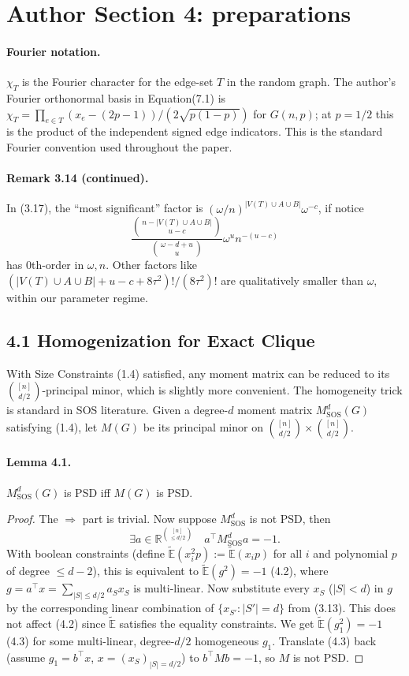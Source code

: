 \documentclass[10pt,a4paper]{article}
\begin{document}
\section*{Author Section 4: preparations}
\paragraph{Fourier notation.} $\chi_T$ is the Fourier character for the edge-set $T$ in the random graph. The author's Fourier orthonormal basis in Equation(7.1) is $\chi_T=\prod_{e\in T}(x_e-(2p-1))/(2\sqrt{p(1-p)})$ for $G(n,p)$; at $p=1/2$ this is the product of the independent signed edge indicators. This is the standard Fourier convention used throughout the paper.
\paragraph{Remark 3.14 (continued).} In (3.17), the ``most significant'' factor is $(\omega/n)^{|V(T)\cup A\cup B|}\omega^{-c}$, if notice
\[\frac{\binom{n-|V(T)\cup A\cup B|}{u-c}}{\binom{\omega-d+u}u}\omega^un^{-(u-c)}\]
has 0th-order in $\omega,n$. Other factors like $(|V(T)\cup A\cup B|+u-c+8\tau^2)!/(8\tau^2)!$ are qualitatively smaller than $\omega$, within our parameter regime.
\subsection*{4.1 Homogenization for Exact Clique}
With Size Constraints (1.4) satisfied, any moment matrix can be reduced to its $\binom{[n]}{d/2}$-principal minor, which is slightly more convenient. The homogeneity trick is standard in SOS literature. Given a degree-$d$ moment matrix $M^d_{\mathrm{SOS}}(G)$ satisfying (1.4), let $M(G)$ be its principal minor on $\binom{[n]}{d/2}\times\binom{[n]}{d/2}$.
\paragraph{Lemma 4.1.} $M^d_{\mathrm{SOS}}(G)$ is PSD iff $M(G)$ is PSD.
\begin{proof}The $\Rightarrow$ part is trivial. Now suppose $M^d_{\mathrm{SOS}}$ is not PSD, then
\[\exists a\in\mathbb R^{\binom{[n]}{\le d/2}}\quad a^\top M^d_{\mathrm{SOS}}a=-1.\tag{4.1}\]
With boolean constraints (define $\widetilde{\mathbb E}(x_i^2p):=\widetilde{\mathbb E}(x_ip)$ for all $i$ and polynomial $p$ of degree $\le d-2$), this is equivalent to $\widetilde{\mathbb E}(g^2)=-1$ (4.2), where $g=a^\top x=\sum_{|S|\le d/2}a_Sx_S$ is multi-linear. Now substitute every $x_S$ ($|S|<d$) in $g$ by the corresponding linear combination of $\{x_{S'}:|S'|=d\}$ from (3.13). This does not affect (4.2) since $\widetilde{\mathbb E}$ satisfies the equality constraints. We get $\widetilde{\mathbb E}(g_1^2)=-1$ (4.3) for some multi-linear, degree-$d/2$ homogeneous $g_1$. Translate (4.3) back (assume $g_1=b^\top x$, $x=(x_S)_{|S|=d/2}$) to $b^\top Mb=-1$, so $M$ is not PSD.\end{proof}
\end{document}
